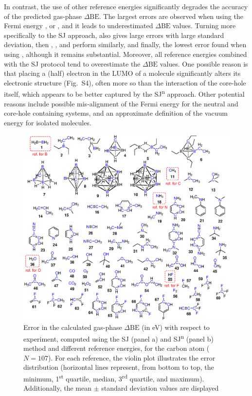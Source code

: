 \documentclass[journal=jpccck,manuscript=article]{achemso}
\def\dbe{\ensuremath{\Delta\text{BE}}}
\begin{document}
In contrast, the use of other reference energies significantly degrades the accuracy of the predicted gas-phase \dbe{}. The largest errors are observed when using the Fermi energy , or , and it leads to underestimated \dbe{} values. 
Turning more specifically to the SJ approach,  also gives large errors with large standard deviation, then , , and  perform similarly, and finally, the lowest error found when using \cpx{\phi}, although it remains substantial. Moreover, all reference energies combined with the SJ protocol tend to overestimate the \dbe{} values. One possible reason is that placing a (half) electron in the LUMO of a molecule significantly alters its electronic structure (Fig.~S4), often more so than the interaction of the core-hole itself, which appears to be better captured by the SJ\textsuperscript{n} approach.\cite{taucherFinalStateSimulationsCoreLevel2020} Other potential reasons include possible mis-alignment of the Fermi energy for the neutral and core-hole containing systems, and an approximate definition of the vacuum energy for isolated molecules.




\begin{figure}
	\centering
	\includegraphics[width=\linewidth]{Figure3}
	\caption{Error in the calculated gas-phase \dbe{}  (in \si{\electronvolt}) with respect to experiment, computed using the SJ (panel a) and SJ\textsuperscript{n} (panel b) method and different reference energies, for the carbon atom ($N=107$). For each reference, the violin plot illustrates the error distribution (horizontal lines represent, from bottom to top, the minimum, 1\textsuperscript{st} quartile, median, 3\textsuperscript{rd} quartile, and maximum). Additionally, the mean $\pm$ standard deviation values are displayed}
	\label{fig:xps_C185_C}
\end{figure}
\end{document}
